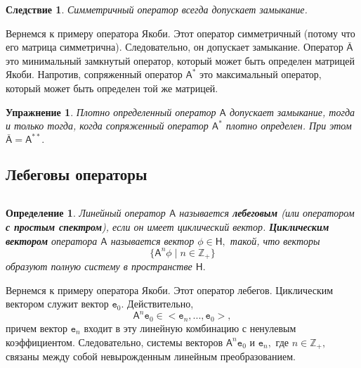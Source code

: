 \documentclass[12pt,a4paper]{article}
\theoremstyle{plain}   \newtheorem{Pro}{Задача}
\newtheorem{Def}{Определение}
\newtheorem{Cor}{Следствие}
\newtheorem{Exe}{Упражнение}
\begin{document}
\begin{Cor}
Симметричный оператор всегда допускает замыкание.
\end{Cor}
Вернемся к примеру оператора Якоби. Этот оператор симметричный
(потому что его матрица симметрична). Следовательно, он допускает
замыкание. Оператор
$ \bar{\mathsf{A}}$
это минимальный замкнутый оператор, который может быть определен
матрицей Якоби. Напротив, сопряженный оператор
$ \mathsf{A}^{\ast} $
это максимальный оператор, который может быть определен
той же матрицей.
\begin{Exe}
Плотно определенный оператор
$ \mathsf{A} $
допускает замыкание, тогда и только тогда, когда сопряженный
оператор
$ \mathsf{A}^{\ast} $
плотно определен. При этом
$ \bar{\mathsf{A}}=\mathsf{A}^{\ast \ast} . $
\end{Exe}
\newpage
\subsection{Лебеговы операторы}
$ \; $
\\
\begin{Def}
Линейный оператор
$ \mathsf{A} $
называется
{\bfseries лебеговым} (или оператором
{\bfseries с простым спектром}),
если он имеет циклический вектор.
{\bfseries Циклическим вектором} оператора
$ \mathsf{A} $
называется вектор
$ \phi \in \mathsf{H} , $
такой, что векторы
$$
  \{ \mathsf{A}^n \phi \; | \; n \in \mathbb{Z}_+ \}
$$
образуют полную систему в пространстве
$ \mathsf{H} . $
\end{Def}
Вернемся к примеру оператора Якоби.
Этот оператор лебегов. Циклическим вектором служит вектор
$ \mathtt{e}_0 . $
Действительно,
$$
  \mathsf{A}^n \mathtt{e}_0 \in
  <\mathtt{e}_n ,...,\mathtt{e}_0 >,
$$
причем вектор
$ \mathtt{e}_n $
входит в эту линейную комбинацию с ненулевым коэффициентом.
Следовательно, системы векторов
$ \mathsf{A}^n \mathtt{e}_0 $
и
$ \mathtt{e}_n , $
где
$ n \in \mathbb{Z}_+ , $
связаны между собой невырожденным линейным преобразованием.
\\
\end{document}
